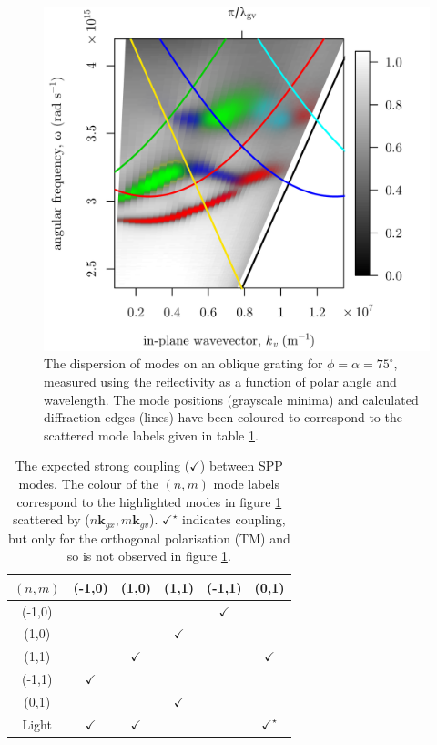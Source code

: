 \begin{figure}
\begin{center}
\includegraphics[width=0.6\linewidth]{figure-oblique-RssAtPhi90-colourcoded}
\end{center}
\caption[The dispersion of modes on an oblique grating for $\phi =\alpha =75^\circ$.]{The dispersion of modes on an oblique grating for $\phi =\alpha =75^\circ$, measured using the reflectivity as a function of polar angle and wavelength. The mode positions (grayscale minima) and calculated diffraction edges (lines) have been coloured to correspond to the scattered mode labels given in table \ref{tbl:obliquecouping}.\label{fig:obliquedispcoloured}}
\end{figure}
\begin{table}
\begin{center}
\begin{tabular}{c||c|c|c|c|c|}
$(n,m)$ 	&\color{red}(-1,0)	& \color{green}(1,0) 	& \color{blue}(1,1) 		& \color{cyan}(-1,1) 	& \color{yellow}(0,1) \tabularnewline
\hline
\hline
\color{red}(-1,0)											& 	 	\cellcolor{lightgray}				&  							&  								& 	$\checkmark$			& \tabularnewline
\color{green}(1,0)\color{black} 					& 	 						& \cellcolor{lightgray} 						& $\checkmark$ 			& 								& \tabularnewline
\color{blue}(1,1)\color{black}  					& 		& 		$\checkmark$						& \cellcolor{lightgray}							& 								& $\checkmark$\tabularnewline
\color{cyan}(-1,1)\color{black}  					&$\checkmark$  						& 								&									&\cellcolor{lightgray}							&\tabularnewline
\color{yellow}(0,1)\color{black}  					& 							& 								& 	$\checkmark$	 		 	&							&\cellcolor{lightgray}\tabularnewline
\hline
Light 														& 	 $\checkmark$	& 	 $\checkmark$		& 									& 		 						&$\checkmark^\star$
\end{tabular}
\end{center}
\caption{The expected strong coupling ($\checkmark$) between SPP modes. The colour of the $(n,m)$ mode labels correspond to the highlighted modes in figure \ref{fig:obliquedispcoloured} scattered by ($n\mathbf{k}_{gx},m\mathbf{k}_{gv}$). $\checkmark^\star$ indicates coupling, but only for the orthogonal polarisation (TM) and so is not observed in figure \ref{fig:obliquedispcoloured}. \label{tbl:obliquecouping} }
\end{table}

